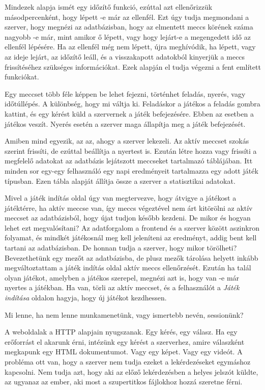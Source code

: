 Mindezek alapja ismét egy időzítő funkció, ezúttal azt ellenőrizzük másodpercenként, hogy lépett -e már az ellenfél. Ezt úgy tudja megmondani a szerver, hogy megnézi az adatbázisban, hogy az elmentett meccs körének száma nagyobb -e már, mint amikor ő lépett, vagy hogy lejárt-e a megengedett idő az ellenfél lépésére. Ha az ellenfél még nem lépett, újra meghívódik, ha lépett, vagy az ideje lejárt, az időzítő leáll, és a visszakapott adatokból kinyerjük a meccs frissítéséhez szükséges információkat. Ezek alapján el tudja végezni a fent említett funkciókat.

Egy meccset több féle képpen be lehet fejezni, történhet feladás, nyerés, vagy időtúllépés. A különbség, hogy mi váltja ki. Feladáskor a játékos a feladás gombra kattint, és egy kérést küld a szervernek a játék befejezésére. Ebben az esetben a játékos veszít. Nyerés esetén a szerver maga állapítja meg a játék befejezését.

Amiben mind egyezik, az az, ahogy a szerver lekezeli. Az aktív meccset szokás szerint frissíti, de ezúttal beállítja a nyertest is. Ezután létre hozza vagy frissíti a megfelelő adatokat az adatbázis lejátszott meccseket tartalmazó táblájában. Itt minden sor egy-egy felhasználó egy napi eredményeit tartalmazza egy adott játék típusban. Ezen tábla alapját állítja össze a szerver a statisztikai adatokat.

Mivel a játék indítás oldal úgy van megtervezve, hogy átvigye a játékost a játéktérre, ha aktív meccse van, így meccs végeztével nem árt kitörölni az aktív meccset az adatbázisból, hogy újat tudjon később kezdeni. De mikor és hogyan lehet ezt megvalósítani? Az adatforgalom a frontend és a szerver között aszinkron folyamat, és mindkét játékosnál meg kell jeleníteni az eredményt, addig bent kell tartani az adatbázisban. De honnan tudja a szerver, hogy mikor törölheti? Bevezethetünk egy mezőt az adatbázisba, de plusz mezők tárolása helyett inkább megváltoztattam a játék indítás oldal aktív meccs ellenőrzését. Ezután ha talál olyan játékot, amelyben a játékos szerepel, megnézi azt is, hogy van -e már nyertes a játékban. Ha van, törli az aktív meccset, és a felhasználót a \textit{Játék indítása} oldalon hagyja, hogy új játékot kezdhessen.


Mi lenne, ha nem lenne munkamenetünk, vagy ismertebb nevén, sessionünk?

A weboldalak a HTTP alapjain nyugszanak. Egy kérés, egy válasz. Ha egy erőforrást el akarunk érni, intézünk egy kérést a szerverhez, amire válaszként megkapunk egy HTML dokumentumot. Vagy egy képet. Vagy egy videót. 
A probléma ott van, hogy a szerver nem tudja ezeket a lekérdezéseket egymáshoz kapcsolni. Nem tudja azt, hogy aki az előző lekérdezésben a helyes jelszót küldte, az ugyanaz az ember, aki most a szupertitkos fájlokhoz hozzá szeretne férni.

